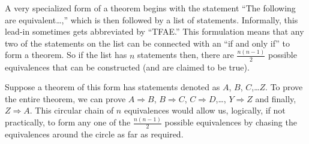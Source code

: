 \begin{para}A very specialized form of a theorem begins with the statement ``The following are equivalent\dots,'' which is then followed by a list of statements.  Informally, this lead-in sometimes gets abbreviated by ``TFAE.''  This formulation means that any two of the statements on the list can be connected with an ``if and only if'' to form a theorem.  So if the list has $n$ statements then, there are $\tfrac{n(n-1)}{2}$ possible equivalences that can be constructed (and are claimed to be true).\end{para}
%
\begin{para}Suppose a theorem of this form has statements denoted as $A$, $B$, $C$,\dots $Z$.  To prove the entire theorem, we can prove $A\Rightarrow B$, $B\Rightarrow C$, $C\Rightarrow D$,\dots, $Y\Rightarrow Z$ and finally, $Z\Rightarrow A$.  This circular chain of $n$ equivalences would allow us, logically, if not practically, to form any one of the $\tfrac{n(n-1)}{2}$ possible equivalences by chasing the equivalences around the circle as far as required.\end{para}  
